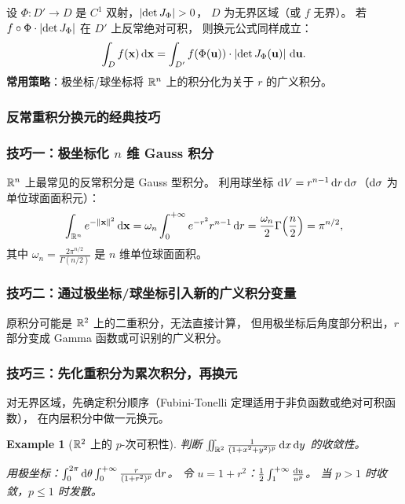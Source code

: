 \documentclass{ctexart}
\newtheorem{example}[theorem]{Example}
\begin{document}
\begin{theorem}[反常重积分的换元]
  设 $\Phi: D' \to D$ 是 $C^1$ 双射，$\left| \det J_\Phi \right| > 0$，
  $D$ 为无界区域（或 $f$ 无界）。
  若 $f \circ \Phi \cdot \left| \det J_\Phi \right|$ 在 $D'$ 上反常绝对可积，
  则换元公式同样成立：
  \[
    \int_D f(\mathbf{x}) \,\mathrm{d} \mathbf{x}
    = \int_{D'} f(\Phi(\mathbf{u})) \cdot \left| \det J_\Phi(\mathbf{u}) \right| \,\mathrm{d} \mathbf{u}.
  \]
  \textbf{常用策略}：极坐标/球坐标将 $\mathbb{R}^n$ 上的积分化为关于 $r$ 的广义积分。
\end{theorem}

\subsubsection*{反常重积分换元的经典技巧}

\subsubsection*{技巧一：极坐标化 $n$ 维 Gauss 积分}

$\mathbb{R}^n$ 上最常见的反常积分是 Gauss 型积分。
利用球坐标 $\mathrm{d} V = r^{n-1}\,\mathrm{d} r\,\mathrm{d} \sigma$（$\mathrm{d} \sigma$ 为单位球面面积元）：
\[
  \int_{\mathbb{R}^n} e^{-\left\| \mathbf{x} \right\|^2} \,\mathrm{d} \mathbf{x}
  = \omega_n \int_0^{+\infty} e^{-r^2} r^{n-1} \,\mathrm{d} r
  = \frac{\omega_n}{2} \Gamma\!\left(\frac{n}{2}\right)
  = \pi^{n/2},
\]
其中 $\omega_n = \frac{2\pi^{n/2}}{\Gamma(n/2)}$ 是 $n$ 维单位球面面积。

\subsubsection*{技巧二：通过极坐标/球坐标引入新的广义积分变量}

原积分可能是 $\mathbb{R}^2$ 上的二重积分，无法直接计算，
但用极坐标后角度部分积出，$r$ 部分变成 Gamma 函数或可识别的广义积分。

\subsubsection*{技巧三：先化重积分为累次积分，再换元}

对无界区域，先确定积分顺序（Fubini-Tonelli 定理适用于非负函数或绝对可积函数），
在内层积分中做一元换元。

\begin{example}[$\mathbb{R}^2$ 上的 $p$-次可积性]
  判断 $\iint_{\mathbb{R}^2} \frac{1}{(1+x^2+y^2)^p} \,\mathrm{d} x\,\mathrm{d} y$ 的收敛性。

  用极坐标：$\int_0^{2\pi} \mathrm{d} \theta \int_0^{+\infty} \frac{r}{(1+r^2)^p} \,\mathrm{d} r$。
  令 $u = 1+r^2$：$\frac{1}{2}\int_1^{+\infty} \frac{\mathrm{d} u}{u^p}$。
  当 $p > 1$ 时收敛，$p \le 1$ 时发散。
\end{example}
\end{document}

